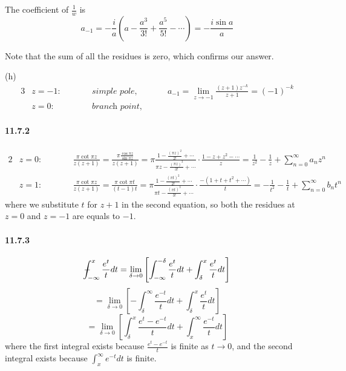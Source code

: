 \documentclass[a4paper]{article}
\begin{document}
The coefficient of $\frac{1}{w}$ is 
\[
a_{-1}=-\frac{i}{a}\left(a-\frac{a^3}{3!}+\frac{a^5}{5!}-\cdots \right)=-\frac{i\sin a}{a}
\]

Note that the sum of all the residues is zero, which confirms our answer.
\medskip

(h)
\begin{alignat*}{3}
    & z=-1:\qquad && \textit{simple pole,}\qquad && a_{-1}=\lim_{z\to-1}\frac{(z+1)z^{-k}}{z+1}=(-1)^{-k}\\
    & z=0:\qquad && \textit{branch point,} && 
\end{alignat*}

\paragraph{11.7.2}
\begin{alignat*}{2}
    & z=0:\qquad && \frac{\pi\cot\pi z}{z(z+1)}=\frac{\pi\frac{\cos\pi z}{\sin\pi z}}{z(z+1)}=\pi\frac{1-\frac{(\pi z)^2}{2!}+\cdots}{\pi z-\frac{(\pi z)^3}{3!}+\cdots}\cdot\frac{1-z+z^2-\cdots}{z}=\frac{1}{z^2}-\frac{1}{z}+\sum_{n=0}^\infty a_nz^n\\
    & z=1:\qquad && \frac{\pi\cot\pi z}{z(z+1)}=\frac{\pi\cot\pi t}{(t-1)t}=\pi\frac{1-\frac{(\pi t)^2}{2!}+\cdots}{\pi t-\frac{(\pi t)^3}{3!}+\cdots}\cdot\frac{-(1+t+t^2+\cdots)}{t}=-\frac{1}{t^2}-\frac{1}{t}+\sum_{n=0}^\infty b_n t^n
\end{alignat*}
where we substitute $t$ for $z+1$ in the second equation, so both the residues at $z=0$ and $z=-1$ are  equals to $-1$.

\paragraph{11.7.3}
\[
\dashint_{-\infty}^x\frac{e^t}{t}dt=
\lim_{\delta\to0}\left[\int_{-\infty}^{-\delta}\frac{e^t}{t}dt+\int_{\delta}^x\frac{e^t}{t}dt \right]\]
\[
=\lim_{\delta\to0}\left[-\int_{\delta}^{\infty}\frac{e^{-t}}{t}dt+\int_{\delta}^x\frac{e^t}{t}dt
 \right]\]
\[ =\lim_{\delta\to0}\left[\int_{\delta}^x\frac{e^t-e^{-t}}{t}dt+\int_x^\infty\frac{e^{-t}}{t}dt \right]
\]
where the first integral exists because $\frac{e^t-e^{-t}}{t}$ is finite as  $t\to0$, and the second integral exists because $\int_x^\infty e^{-t}dt$ is finite.
\end{document}
